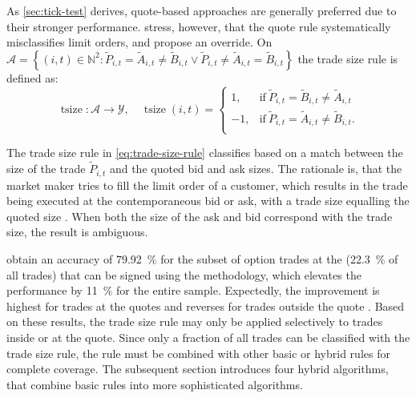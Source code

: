 As \cref{sec:tick-test} derives, quote-based approaches are generally preferred due to their stronger performance. \textcite[][13]{grauerOptionTradeClassification2022} stress, however, that the quote rule systematically misclassifies limit orders, and propose an override. On $\mathcal{A} = \left\{(i, t) \in \mathbb{N}^2: \tilde{P}_{i,t} = \tilde{A}_{i,t} \neq \tilde{B}_{i,t} \lor \tilde{P}_{i,t} \neq\tilde{A}_{i,t} = \tilde{B}_{i,t} \right\}$ the trade size rule is defined as:
\begin{equation}
    \operatorname{tsize} \colon \mathcal{A} \to \mathcal{Y},\quad
    \operatorname{tsize}(i, t)=
    \begin{cases}
        1,  & \text{if}\ \tilde{P}_{i, t} = \tilde{B}_{i, t} \neq \tilde{A}_{i, t}  \\
        -1, & \text{if}\ \tilde{P}_{i, t} = \tilde{A}_{i, t} \neq \tilde{B}_{i, t}. \\
    \end{cases}
    \label{eq:trade-size-rule}
\end{equation}

The trade size rule in \cref{eq:trade-size-rule} classifies based on a match between the size of the trade $\tilde{P}_{i, t}$ and the quoted bid and ask sizes. The rationale is, that the market maker tries to fill the limit order of a customer, which results in the trade being executed at the contemporaneous bid or ask, with a trade size equalling the quoted size \autocite[][13]{grauerOptionTradeClassification2022}. When both the size of the ask and bid correspond with the trade size, the result is ambiguous.

\textcite[][13]{grauerOptionTradeClassification2022} obtain an accuracy of \SI{79.92}{\percent} for the subset of option trades at the  (\SI{22.3}{\percent} of all trades) that can be signed using the methodology, which elevates the performance by \SI{11}{\percent} for the entire sample. Expectedly, the improvement is highest for trades at the quotes and reverses for trades outside the quote \autocite[][15]{grauerOptionTradeClassification2022}. Based on these results, the trade size rule may only be applied selectively to trades inside or at the quote. Since only a fraction of all trades can be classified with the trade size rule, the rule must be combined with other basic or hybrid rules for complete coverage. The subsequent section introduces four hybrid algorithms, that combine basic rules into more sophisticated algorithms.

